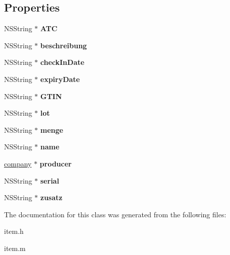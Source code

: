 \subsection*{Properties}
\begin{DoxyCompactItemize}
\item 
\hypertarget{interfaceitem_a15aa938e553c82e5b0ea2d7055c2612f}{}N\+S\+String $\ast$ {\bfseries A\+T\+C}\label{interfaceitem_a15aa938e553c82e5b0ea2d7055c2612f}

\item 
\hypertarget{interfaceitem_a5aad3c8fc09e373beca2e47abed4c8fb}{}N\+S\+String $\ast$ {\bfseries beschreibung}\label{interfaceitem_a5aad3c8fc09e373beca2e47abed4c8fb}

\item 
\hypertarget{interfaceitem_a754edf1b91934ec0712e92c2c0bc9908}{}N\+S\+String $\ast$ {\bfseries check\+In\+Date}\label{interfaceitem_a754edf1b91934ec0712e92c2c0bc9908}

\item 
\hypertarget{interfaceitem_a6813714598bc32ef4430c5a150b05485}{}N\+S\+String $\ast$ {\bfseries expiry\+Date}\label{interfaceitem_a6813714598bc32ef4430c5a150b05485}

\item 
\hypertarget{interfaceitem_ab49ff4ff0e4fe4424ec62b02037c25bb}{}N\+S\+String $\ast$ {\bfseries G\+T\+I\+N}\label{interfaceitem_ab49ff4ff0e4fe4424ec62b02037c25bb}

\item 
\hypertarget{interfaceitem_aad62b489405eb62003ffe6c332f15477}{}N\+S\+String $\ast$ {\bfseries lot}\label{interfaceitem_aad62b489405eb62003ffe6c332f15477}

\item 
\hypertarget{interfaceitem_a6d5f27611d9e85825fed803200d0cc97}{}N\+S\+String $\ast$ {\bfseries menge}\label{interfaceitem_a6d5f27611d9e85825fed803200d0cc97}

\item 
\hypertarget{interfaceitem_a83107554be2adb6084cff1fd443780ab}{}N\+S\+String $\ast$ {\bfseries name}\label{interfaceitem_a83107554be2adb6084cff1fd443780ab}

\item 
\hypertarget{interfaceitem_a53ac110b047592f9888cfb0aaf449380}{}\hyperlink{interfacecompany}{company} $\ast$ {\bfseries producer}\label{interfaceitem_a53ac110b047592f9888cfb0aaf449380}

\item 
\hypertarget{interfaceitem_ae8500cdffcb4748939ec30dfcc3b7d18}{}N\+S\+String $\ast$ {\bfseries serial}\label{interfaceitem_ae8500cdffcb4748939ec30dfcc3b7d18}

\item 
\hypertarget{interfaceitem_ad635e848e83211acf0a75094f9e46224}{}N\+S\+String $\ast$ {\bfseries zusatz}\label{interfaceitem_ad635e848e83211acf0a75094f9e46224}

\end{DoxyCompactItemize}


The documentation for this class was generated from the following files\+:\begin{DoxyCompactItemize}
\item 
item.\+h\item 
item.\+m\end{DoxyCompactItemize}
